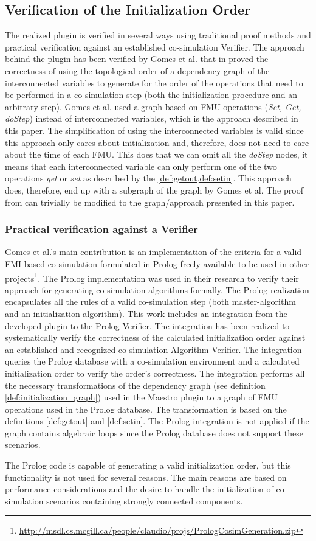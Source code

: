 \subsection{Verification of the Initialization Order}
The realized plugin is verified in several ways using traditional proof methods and practical verification against an established co-simulation Verifier. The approach behind the plugin has been verified by Gomes et al. that in \cite{gomes_lucio_vangheluwe_2019} proved the correctness of using the topological order of a dependency graph of the interconnected variables to generate for the order of the operations that need to be performed in a co-simulation step (both the initialization procedure and an arbitrary step). Gomes et al. used a graph based on FMU-operations (\textit{Set, Get, doStep}) instead of interconnected variables, which is the approach described in this paper. The simplification of using the interconnected variables is valid since this approach only cares about initialization and, therefore, does not need to care about the time of each FMU. This does that we can omit all the \textit{doStep} nodes, it means that each interconnected variable can only perform one of the two operations \textit{get} or \textit{set} as described by the \cref{def:getout,def:setin}.
This approach does, therefore, end up with a subgraph of the graph by Gomes et al. The proof from \cite{gomes_lucio_vangheluwe_2019} can trivially be modified to the graph/approach presented in this paper.

\subsubsection{Practical verification against a Verifier} 
Gomes et al.'s main contribution is an implementation of the criteria for a valid FMI based co-simulation formulated in Prolog freely available to be used in other projects\footnote{\url{http://msdl.cs.mcgill.ca/people/claudio/projs/PrologCosimGeneration.zip}}. The Prolog implementation was used in their research to verify their approach for generating co-simulation algorithms formally. The Prolog realization encapsulates all the rules of a valid co-simulation step (both master-algorithm and an initialization algorithm). 
This work includes an integration from the developed plugin to the Prolog Verifier. The integration has been realized to systematically verify the correctness of the calculated initialization order against an established and recognized co-simulation Algorithm Verifier. The integration queries the Prolog database with a co-simulation environment and a calculated initialization order to verify the order's correctness. The integration performs all the necessary transformations of the dependency graph (see definition \ref{def:initialization_graph}) used in the Maestro plugin to a graph of FMU operations used in the Prolog database. The transformation is based on the definitions \ref{def:getout} and \ref{def:setin}. The Prolog integration is not applied if the graph contains algebraic loops since the Prolog database does not support these scenarios.

The Prolog code is capable of generating a valid initialization order, but this functionality is not used for several reasons. The main reasons are based on performance considerations and the desire to handle the initialization of co-simulation scenarios containing strongly connected components.